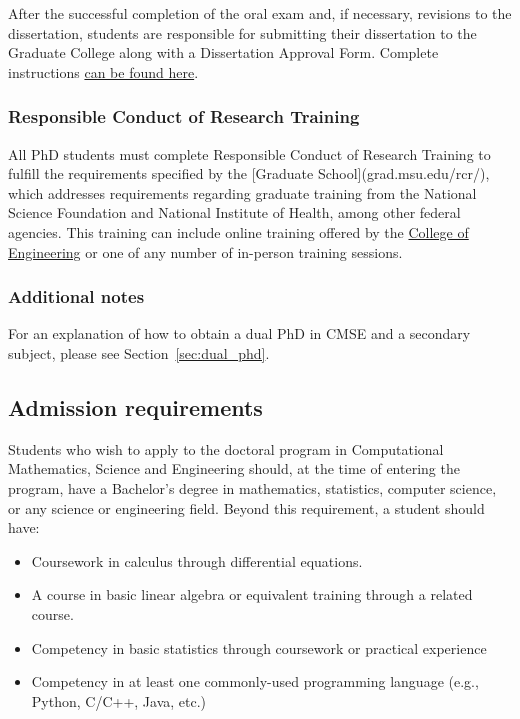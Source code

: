\noindent
After the successful completion of the oral exam and, if necessary,
revisions to the dissertation, students are responsible for submitting
their dissertation to the Graduate College along with a Dissertation
Approval Form.  Complete
instructions \href{https://grad.msu.edu/etd}{can be found here}.


\vspace{3mm}
\subsubsection{Responsible Conduct of Research Training}

All PhD students must complete Responsible Conduct of Research
Training to fulfill the requirements specified by the [Graduate
School](grad.msu.edu/rcr/), which addresses requirements regarding
graduate training from the National Science Foundation and National
Institute of Health, among other federal agencies.  This training can
include online training offered by the \href{https://www.egr.msu.edu/secureresearchcourses/}{College of
Engineering}  or one of
any number of in-person training sessions.

\vspace{3mm}
\subsubsection{Additional notes}

For an explanation of how to obtain a dual PhD in CMSE and a secondary
subject, please see Section~\ref{sec:dual_phd}.


\subsection{Admission requirements}
\label{sec:phd_admission}

Students who wish to apply to the doctoral program in Computational
Mathematics, Science and Engineering should, at the time of entering
the program, have a Bachelor's degree in mathematics, statistics,
computer science, or any science or engineering field.  Beyond this
requirement, a student should have:

\begin{itemize}
\item Coursework in calculus through differential equations.

\item A course in basic linear algebra or equivalent training through
  a related course.

\item Competency in basic statistics through coursework or practical
  experience

\item Competency in at least one commonly-used programming language
  (e.g., Python, C/C++, Java, etc.)

\end{itemize}

